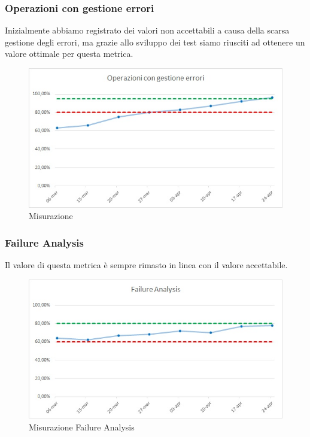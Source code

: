 \subsubsection{Operazioni con gestione errori}
Inizialmente abbiamo registrato dei valori non accettabili a causa della scarsa gestione degli errori, ma grazie allo sviluppo dei test siamo riusciti ad ottenere un valore ottimale per questa metrica.
\begin{figure} [H]
	\centering
	\includegraphics[scale=1]{Img/blocco}
	\caption{Misurazione }\label{}
\end{figure}

\subsubsection{Failure Analysis}
Il valore di questa metrica è sempre rimasto in linea con il valore accettabile.
\begin{figure} [H]
	\centering
	\includegraphics[scale=1]{Img/FA}
	\caption{Misurazione Failure Analysis}\label{}
\end{figure}

